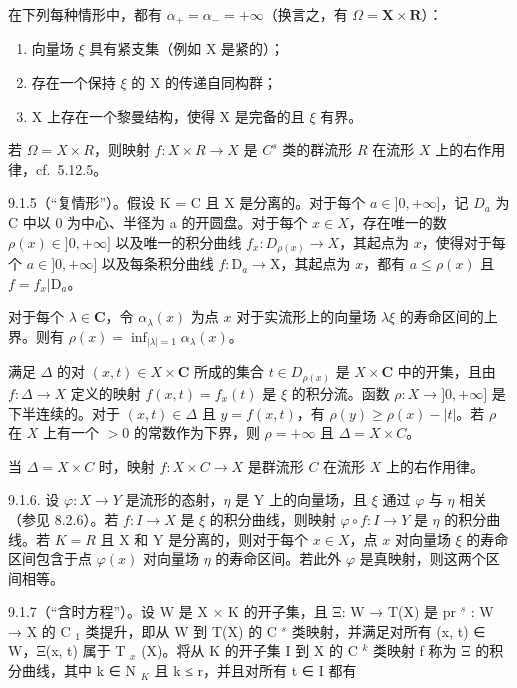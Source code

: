 在下列每种情形中，都有 \(\alpha_{+} = \alpha_{-} = +\infty\)（换言之，有 \(\Omega = \mathbf{X} \times \mathbf{R}\)）：

\begin{enumerate}
\def\labelenumi{(\roman{enumi})}
\item
  向量场 \(\xi\) 具有紧支集（例如 X 是紧的）；
\item
  存在一个保持 \(\xi\) 的 X 的传递自同构群；
\item
  X 上存在一个黎曼结构，使得 X 是完备的且 \(\xi\) 有界。
\end{enumerate}

若 \(\Omega = X \times R\)，则映射 \(f: X \times R \to X\) 是 \(C^s\) 类的群流形 \(R\) 在流形 \(X\) 上的右作用律，cf.~5.12.5。

9.1.5（“复情形”）。假设 K = C 且 X 是分离的。对于每个 \(a \in ]0, +\infty]\)，记 \(D_a\) 为 C 中以 0 为中心、半径为 a 的开圆盘。对于每个 \(x \in X\)，存在唯一的数 \(\rho(x) \in ]0, +\infty]\) 以及唯一的积分曲线 \(f_x: D_{\rho(x)} \to X\)，其起点为 \(x\)，使得对于每个 \(a \in ]0, +\infty]\) 以及每条积分曲线 \(f: \mathrm{D}_a \to \mathrm{X}\)，其起点为 \(x\)，都有 \(a \leqslant \rho(x)\) 且 \(f = f_x | \mathrm{D}_a\)。

对于每个 \(\lambda\in\mathbf{C}\)，令 \(\alpha_{\lambda}(x)\) 为点 \(x\) 对于实流形上的向量场 \(\lambda\xi\) 的寿命区间的上界。则有 \(\rho(x)=\inf_{|\lambda|=1}\alpha_{\lambda}(x)\)。

满足 \(\Delta\) 的对 \((x,t)\in X\times\mathbf{C}\) 所成的集合 \(t\in D_{\rho(x)}\) 是 \(X\times\mathbf{C}\) 中的开集，且由 \(f:\Delta\to X\) 定义的映射 \(f(x,t)=f_x(t)\) 是 \(\xi\) 的积分流。函数 \(\rho:X\to ]0,+\infty]\) 是下半连续的。对于 \((x,t)\in\Delta\) 且 \(y=f(x,t)\)，有 \(\rho(y)\geqslant\rho(x)-|t|\)。若 \(\rho\) 在 \(X\) 上有一个 \(>0\) 的常数作为下界，则 \(\rho = +\infty\) 且 \(\Delta = X \times C\)。

当 \(\Delta = X \times C\) 时，映射 \(f: X \times C \to X\) 是群流形 \(C\) 在流形 \(X\) 上的右作用律。

9.1.6. 设 \(\varphi: X \to Y\) 是流形的态射，\(\eta\) 是 Y 上的向量场，且 \(\xi\) 通过 \(\varphi\) 与 \(\eta\) 相关（参见 8.2.6）。若 \(f: I \to X\) 是 \(\xi\) 的积分曲线，则映射 \(\varphi \circ f: I \to Y\) 是 \(\eta\) 的积分曲线。若 \(K = R\) 且 X 和 Y 是分离的，则对于每个 \(x \in X\)，点 \(x\) 对向量场 \(\xi\) 的寿命区间包含于点 \(\varphi(x)\) 对向量场 \(\eta\) 的寿命区间。若此外 \(\varphi\) 是真映射，则这两个区间相等。

9.1.7（“含时方程”）。设 W 是 X × K 的开子集，且 Ξ: W → T(X) 是 pr \(^{s}\) : W → X 的 C \(_{1}\) 类提升，即从 W 到 T(X) 的 C \(^{s}\) 类映射，并满足对所有 (x, t) ∈ W，Ξ(x, t) 属于 T \(_{x}\) (X)。将从 K 的开子集 I 到 X 的 C \(^{k}\) 类映射 f 称为 Ξ 的积分曲线，其中 k ∈ N \(_{K}\) 且 k ≤ r，并且对所有 t ∈ I 都有

